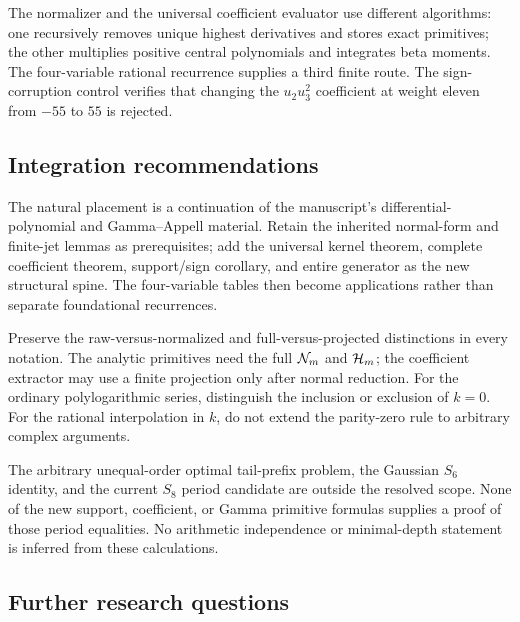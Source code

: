 The normalizer and the universal coefficient evaluator use different algorithms: one recursively removes unique highest derivatives and stores exact primitives; the other multiplies positive central polynomials and integrates beta moments. The four-variable rational recurrence supplies a third finite route. The sign-corruption control verifies that changing the $u_2u_3^2$ coefficient at weight eleven from $-55$ to $55$ is rejected.

\subsection{Integration recommendations}

The natural placement is a continuation of the manuscript's differential-polynomial and Gamma--Appell material. Retain the inherited normal-form and finite-jet lemmas as prerequisites; add the universal kernel theorem, complete coefficient theorem, support/sign corollary, and entire generator as the new structural spine. The four-variable tables then become applications rather than separate foundational recurrences.

Preserve the raw-versus-normalized and full-versus-projected distinctions in every notation. The analytic primitives need the full $\mathcal N_m$ and $\mathcal H_m$; the coefficient extractor may use a finite projection only after normal reduction. For the ordinary polylogarithmic series, distinguish the inclusion or exclusion of $k=0$. For the rational interpolation in $k$, do not extend the parity-zero rule to arbitrary complex arguments.

The arbitrary unequal-order optimal tail-prefix problem, the Gaussian $S_6$ identity, and the current $S_8$ period candidate are outside the resolved scope. None of the new support, coefficient, or Gamma primitive formulas supplies a proof of those period equalities. No arithmetic independence or minimal-depth statement is inferred from these calculations.

\subsection{Further research questions}

